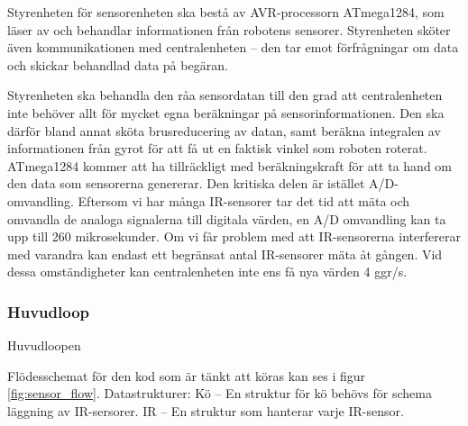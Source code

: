\documentclass[a4paper,titlepage,12pt]{article}
\begin{document}
	Styrenheten för sensorenheten ska bestå av AVR-processorn ATmega1284, som läser av och 
	behandlar informationen från robotens sensorer. Styrenheten sköter även
	kommunikationen med centralenheten -- den tar emot förfrågningar om data och
	skickar behandlad data på begäran.

	Styrenheten ska behandla den råa sensordatan till den grad att
	centralenheten inte behöver allt för mycket egna beräkningar på
	sensorinformationen. Den ska därför bland annat sköta brusreducering av
	datan, samt beräkna integralen av informationen från gyrot för att få ut en
	faktisk vinkel som roboten roterat. ATmega1284 kommer att ha tillräckligt med 
	beräkningskraft för att ta hand om den data som sensorerna genererar. Den kritiska 
	delen är istället A/D-omvandling. Eftersom vi har många IR-sensorer tar det tid att 
	mäta och omvandla de analoga signalerna till digitala värden, en A/D omvandling kan ta 
	upp till 260 mikrosekunder. Om vi får problem med att IR-sensorerna interfererar med 
	varandra kan endast ett begränsat antal IR-sensorer mäta åt gången. Vid
    dessa omständigheter kan 
	centralenheten inte ens få nya värden 4 ggr/s. %

    \subsubsection{Huvudloop}
    Huvudloopen 

    Flödesschemat för den kod som är tänkt att köras kan ses i figur
    \ref{fig:sensor_flow}. 
	Datastrukturer:
	Kö -- En struktur för kö behövs för schema läggning av IR-sersorer. 
	IR -- En struktur som hanterar varje IR-sensor. 
    \newpage
\end{document}
